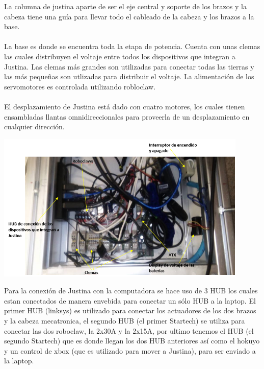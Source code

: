 \documentclass[a4paper,usenames,dvipsnames,svgnames,table]{book}
\begin{document}
La columna de justina aparte de ser el eje central y soporte de los brazos y la cabeza tiene una guía para llevar todo el
cableado de la cabeza y los brazos a la base.\\
\\
La base es donde se encuentra toda la etapa de potencia. Cuenta con unas clemas las cuales distribuyen el voltaje entre 
todos los dispositivos que integran a Justina. Las clemas más grandes son utilizadas para conectar todas las tierras y las
más pequeñas son utlizadas para distribuir el voltaje. La alimentación de los servomotores es controlada utilizando 
robloclaw.\\
\\

El desplazamiento de Justina está dado con cuatro motores, los cuales tienen ensambladas llantas omnidireccionales
para proveerla de un desplazamiento en cualquier dirección.

\begin{center}
\includegraphics[width=0.9\textwidth]{Figures/Hardware/Diagramas/Base.png}
\label{fig:Hardware:Diagramas:Justina:Base}
\end{center}

Para la conexión de Justina con la computadora se hace uso de 3 HUB los cuales estan conectados de manera envebida para conectar
un sólo HUB a la laptop. El primer HUB (linksys) es utilizado para conectar los actuadores de los dos brazos y la cabeza mecatronica,
el segundo HUB (el primer Startech) se utiliza para conectar las dos roboclaw, la 2x30A y la 2x15A, por ultimo tenemos el HUB (el segundo 
Startech) que es donde llegan los dos HUB anteriores así como el hokuyo y un control de xbox (que es utilizado para mover a Justina), para
ser enviado a la laptop.\\
\\
\end{document}
